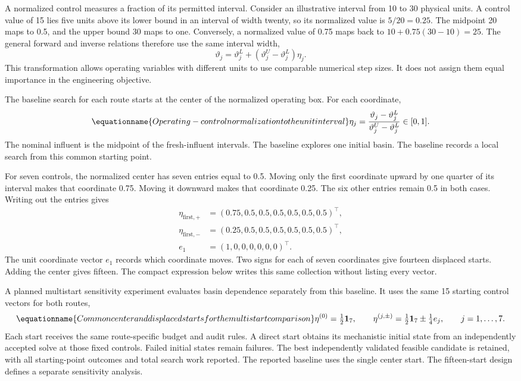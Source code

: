 A normalized control measures a fraction of its permitted interval. Consider an illustrative interval from 10 to 30 physical units. A control value of 15 lies five units above its lower bound in an interval of width twenty, so its normalized value is $5/20=0.25$. The midpoint 20 maps to 0.5, and the upper bound 30 maps to one. Conversely, a normalized value of 0.75 maps back to $10+0.75(30-10)=25$. The general forward and inverse relations therefore use the same interval width,
\[
\vartheta_j=\vartheta_j^L+(\vartheta_j^U-\vartheta_j^L)\eta_j.
\]
This transformation allows operating variables with different units to use comparable numerical step sizes. It does not assign them equal importance in the engineering objective.

The baseline search for each route starts at the center of the normalized operating box. For each coordinate,
\begin{equation}
\equationname{Operating-control normalization to the unit interval}
\eta_j=\frac{\vartheta_j-\vartheta_j^L}{\vartheta_j^U-\vartheta_j^L}\in[0,1].
\label{eq:plant_normalized_controls}
\end{equation}
The nominal influent is the midpoint of the fresh-influent intervals. The baseline explores one initial basin. The baseline records a local search from this common starting point.

For seven controls, the normalized center has seven entries equal to 0.5. Moving only the first coordinate upward by one quarter of its interval makes that coordinate 0.75. Moving it downward makes that coordinate 0.25. The six other entries remain 0.5 in both cases. Writing out the entries gives
\[
\begin{aligned}
\eta_{\mathrm{first},+}&=(0.75,0.5,0.5,0.5,0.5,0.5,0.5)^\top,\\
\eta_{\mathrm{first},-}&=(0.25,0.5,0.5,0.5,0.5,0.5,0.5)^\top,\\
e_1&=(1,0,0,0,0,0,0)^\top.
\end{aligned}
\]
The unit coordinate vector $e_1$ records which coordinate moves. Two signs for each of seven coordinates give fourteen displaced starts. Adding the center gives fifteen. The compact expression below writes this same collection without listing every vector.

A planned multistart sensitivity experiment evaluates basin dependence separately from this baseline. It uses the same 15 starting control vectors for both routes,
\begin{equation}
\equationname{Common center and displaced starts for the multistart comparison}
\eta^{(0)}=\tfrac12\mathbf1_7,\qquad
\eta^{(j,\pm)}=\tfrac12\mathbf1_7\pm\tfrac14e_j,
\qquad j=1,\ldots,7.
\label{eq:plant_multistart_design}
\end{equation}
Each start receives the same route-specific budget and audit rules. A direct start obtains its mechanistic initial state from an independently accepted solve at those fixed controls. Failed initial states remain failures. The best independently validated feasible candidate is retained, with all starting-point outcomes and total search work reported. The reported baseline uses the single center start. The fifteen-start design defines a separate sensitivity analysis.

